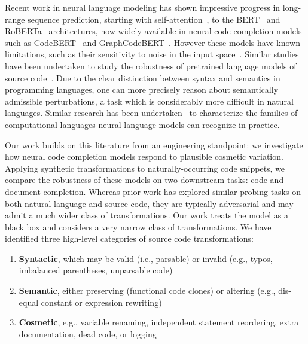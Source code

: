 \documentclass[usenames,dvipsnames]{article} %
\begin{document}
Recent work in neural language modeling has shown impressive progress in long-range sequence prediction, starting with self-attention~\citep{vaswani2017attention}, to the BERT~\citep{devlin2018bert} and RoBERTa~\citep{liu2019roberta} architectures, now widely available in neural code completion models such as CodeBERT~\citep{feng2020codebert} and GraphCodeBERT~\citep{guo2021graphcodebert}. However these models have known limitations, such as their sensitivity to noise in the input space~\cite{sun2020adv}. Similar studies have been undertaken to study the robustness of pretrained language models of source code~\citep{bielik2020adversarial, zhou2021adversarial}. Due to the clear distinction between syntax and semantics in programming languages, one can more precisely reason about semantically admissible perturbations, a task which is considerably more difficult in natural languages. Similar research has been undertaken~\citep{weiss2018practical, chirkova2020empirical, chen2021evaluating} to characterize the families of computational languages neural language models can recognize in practice.

Our work builds on this literature from an engineering standpoint: we investigate how neural code completion models respond to plausible cosmetic variation. Applying synthetic transformations to naturally-occurring code snippets, we compare the robustness of these models on two downstream tasks: code and document completion. Whereas prior work has explored similar probing tasks on both natural language and source code, they are typically adversarial and may admit a much wider class of transformations. Our work treats the model as a black box and considers a very narrow class of transformations. We have identified three high-level categories of source code transformations:

\begin{enumerate}[itemsep=1ex]
  \item \textbf{Syntactic}, which may be valid (i.e., parsable) or invalid (e.g., typos, imbalanced parentheses, unparsable code)
  \item \textbf{Semantic}, either preserving (functional code clones) or altering (e.g., dis-equal constant or expression rewriting)
  \item \textbf{Cosmetic}, e.g., variable renaming, independent statement reordering, extra documentation, dead code, or logging
\end{enumerate}
\end{document}

